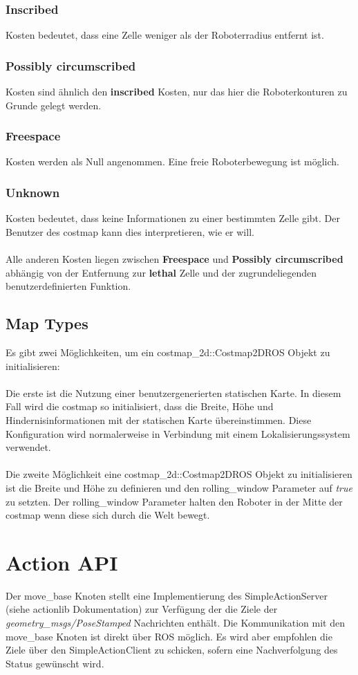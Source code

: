 \documentclass[oribibl]{llncs}
\begin{document}
\subsubsection{Inscribed} Kosten bedeutet, dass eine Zelle weniger als der Roboterradius entfernt ist.
\subsubsection{Possibly circumscribed} Kosten sind ähnlich den \textbf{inscribed} Kosten, nur das hier die Roboterkonturen zu Grunde gelegt werden. 
\subsubsection{Freespace} Kosten werden als Null angenommen. Eine freie Roboterbewegung ist möglich.
\subsubsection{Unknown} Kosten bedeutet, dass keine Informationen zu einer bestimmten Zelle gibt. Der Benutzer des costmap kann dies interpretieren, wie er will.
\\\\Alle anderen Kosten liegen zwischen \textbf{Freespace} und \textbf{Possibly circumscribed} abhängig von der Entfernung zur \textbf{lethal} Zelle und der zugrundeliegenden benutzerdefinierten Funktion.

\subsection{Map Types}
Es gibt zwei Möglichkeiten, um ein costmap\_2d::Costmap2DROS Objekt zu initialisieren:
\\\\Die erste ist die Nutzung einer benutzergenerierten statischen Karte. In diesem Fall wird die costmap so initialisiert, dass die Breite, Höhe und Hindernisinformationen mit der statischen Karte übereinstimmen. Diese Konfiguration wird normalerweise in Verbindung mit einem Lokalisierungssystem verwendet.\\\\
Die zweite Möglichkeit eine costmap\_2d::Costmap2DROS Objekt zu initialisieren ist die Breite und Höhe zu definieren und den rolling\_window Parameter auf \textit{true} zu setzten. Der rolling\_window Parameter halten den Roboter in der Mitte der costmap wenn diese sich durch die Welt bewegt.
\section{Action API}
Der move\_base Knoten stellt eine Implementierung des SimpleActionServer (siehe actionlib Dokumentation) zur Verfügung der die Ziele der \textit{geometry\_msgs/PoseStamped} Nachrichten enthält. Die Kommunikation mit den move\_base Knoten ist direkt über ROS möglich. Es wird aber empfohlen die Ziele über den SimpleActionClient zu schicken, sofern eine Nachverfolgung des Status gewünscht wird.
\end{document}
